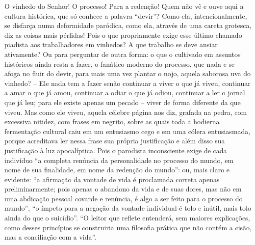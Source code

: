 \begin{enumerate}
\begin{enumerate}
    O vinhedo do Senhor! O processo! Para a redenção! Quem não vê e ouve
    aqui a cultura histórica, que só conhece a palavra ``devir''? Como
    ela, intencionalmente, se disfarça numa deformidade paródica, como
    ela, através de uma careta grotesca, diz as coisas mais pérfidas!
    Pois o que propriamente exige esse último chamado piadista aos
    trabalhadores em vinhedos? A que trabalho se deve ansiar ativamente?
    Ou para perguntar de outra forma: o que o cultivado em assuntos
    históricos ainda resta a fazer, o fanático moderno do processo, que
    nada e se afoga no fluir do devir, para mais uma vez plantar o nojo,
    aquela saborosa uva do vinhedo? -- Ele nada tem a fazer senão
    continuar a viver o que já viveu, continuar a amar o que já amou,
    continuar a odiar o que já odiou, continuar a ler o jornal que já
    leu; para ele existe apenas um pecado -- viver de forma diferente da
    que viveu. Mas como ele viveu, aquela célebre página nos diz,
    grafada na pedra, com excessiva nitidez, com frases em negrito,
    sobre as quais toda a hodierna fermentação cultural caiu em um
    entusiasmo cego e em uma cólera entusiasmada, porque acreditava ler
    nessa frase sua própria justificação e além disso sua justificação à
    luz apocalíptica. Pois o parodista inconsciente exige de cada
    indivíduo ``a completa renúncia da personalidade no processo do
    mundo, em nome de sua finalidade, em nome da redenção do mundo'':
    ou, mais claro e evidente: ``a afirmação da vontade de vida é
    proclamada correta apenas preliminarmente; pois apenas o abandono da
    vida e de suas dores, mas não em uma abdicação pessoal covarde e
    renúncia, é algo a ser feito para o processo do mundo'', ``o ímpeto
    para a negação da vontade individual é tolo e inútil, mais tolo
    ainda do que o suicídio''. ``O leitor que reflete entenderá, sem
    maiores explicações, como desses princípios se construiria uma
    filosofia prática que não contém a cisão, mas a conciliação com a
    vida''.


\end{enumerate}
\end{enumerate}
